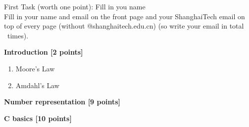 \documentclass[addpoints, 12pt]{exam}
\begin{document}
\begin{questions}

\question[1] First Task (worth one point): Fill in you name\\
Fill in your name and email on the front page and your ShanghaiTech email on top of every page (without @shanghaitech.edu.cn) (so write your email in total \numpages ~times).


\newpage


\question[2] \textbf{Introduction [2 points]}
\begin{enumerate}[(1)]
	\item Moore's Law
	\item Amdahl's Law
\end{enumerate}


\question[9] \textbf{Number representation [9 points]}\\

\newpage


\question \textbf{C basics [10 points]}




\end{questions}
\end{document}
